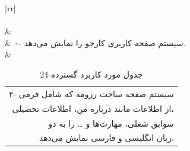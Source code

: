 \documentclass[12pt]{article}
\begin{document}
\begin{center}
\begin{table}[ht]
\begin{tabular}{|rr|}
			\end{tabular}
		\end{table}

		\begin{table}[H]
			\caption{جدول مورد کاربرد گسترده 24}
			\label{tab:ext-uc24}
			\begin{tabular}{|rr|}
				\hline
				\rowcolor{Gainsboro!60}
				                                                                                                                                                                                                                                                                                           \\ \hline
				                                                                                                                                                                                                                                                                        \\ \hline
				                                                                                                             &                                                                                                                                                         \\ \hline
				                                                                                                                         & ۰- سیستم صفحه کاربری کارجو را نمایش می‌دهد.                                                                                                                                                             \\ \hline
				               & \begin{tabular}[c]{@{}r@{}}۲- سیستم صفحه ساخت رزومه که شامل فرمی \\ از اطلاعات مانند درباره من، اطلاعات تحصیلی، \\ سوابق شغلی، مهارت‌ها و … را به دو\\  زبان انگلیسی و فارسی نمایش می‌دهد.\end{tabular} \\ \hline

\end{tabular}
\end{table}
\end{center}
\end{document}
